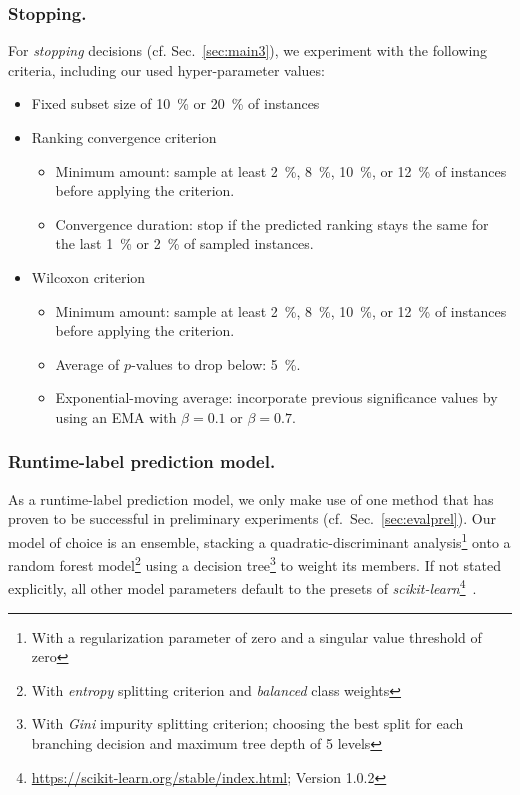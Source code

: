 \documentclass[runningheads]{llncs}
\begin{document}
\subsubsection{Stopping.}
For \emph{stopping} decisions (cf. Sec.~\ref{sec:main3}), we experiment with the following criteria, including our used hyper-parameter values:
\begin{itemize}
  \item Fixed subset size of \SI{10}{\%} or \SI{20}{\%} of instances
  \item Ranking convergence criterion
  \begin{itemize}
    \item Minimum amount: sample at least \SI{2}{\%}, \SI{8}{\%}, \SI{10}{\%}, or \SI{12}{\%} of instances before applying the criterion.
    \item Convergence duration: stop if the predicted ranking stays the same for the last \SI{1}{\%} or \SI{2}{\%} of sampled instances.
  \end{itemize}

  \item Wilcoxon criterion
  \begin{itemize}
    \item Minimum amount: sample at least \SI{2}{\%}, \SI{8}{\%}, \SI{10}{\%}, or \SI{12}{\%} of instances before applying the criterion.
    \item Average of $p$-values to drop below: \SI{5}{\%}.
    \item Exponential-moving average: incorporate previous significance values by using an EMA with $\beta = 0.1$ or $\beta = 0.7$.
  \end{itemize}
\end{itemize}

\subsubsection{Runtime-label prediction model.}
As a runtime-label prediction model, we only make use of one method that has proven to be successful in preliminary experiments (cf.~Sec.~\ref{sec:evalprel}).
Our model of choice is an ensemble, stacking a quadratic-discriminant analysis\footnote{With a regularization parameter of zero and a singular value threshold of zero} onto a random forest model\footnote{With \emph{entropy} splitting criterion and \emph{balanced} class weights} using a decision tree\footnote{With \emph{Gini} impurity splitting criterion; choosing the best split for each branching decision and maximum tree depth of 5 levels} to weight its members.
If not stated explicitly, all other model parameters default to the presets of \emph{scikit-learn}\footnote{\url{https://scikit-learn.org/stable/index.html}; Version 1.0.2}~\cite{scikit-learn}.
\end{document}

